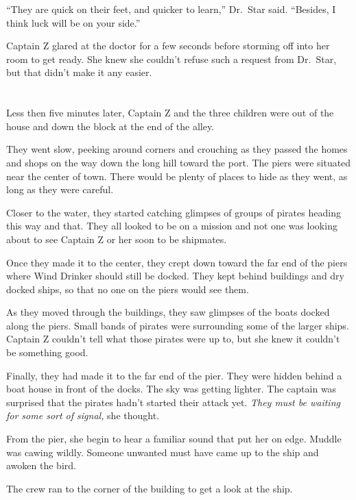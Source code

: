 \documentclass[12pt]{extbook}
\begin{document}
  \enquote{They are quick on their feet, and quicker to learn,} Dr.~Star
  said. \enquote{Besides, I think luck will be on your side.}
  
  Captain Z glared at the doctor for a few seconds before storming off
  into her room to get ready. She knew she couldn't refuse such a request
  from Dr.~Star, but that didn't make it any easier.
  
  \section{}\label{section-34}
  
  Less then five minutes later, Captain Z and the three children were out
  of the house and down the block at the end of the alley.
  
  They went slow, peeking around corners and crouching as they passed the
  homes and shops on the way down the long hill toward the port. The piers
  were situated near the center of town. There would be plenty of places
  to hide as they went, as long as they were careful.
  
  Closer to the water, they started catching glimpses of groups of pirates
  heading this way and that. They all looked to be on a mission and not
  one was looking about to see Captain Z or her soon to be shipmates.
  
  Once they made it to the center, they crept down toward the far end of
  the piers where Wind Drinker should still be docked. They kept behind
  buildings and dry docked ships, so that no one on the piers would see
  them.
  
  As they moved through the buildings, they saw glimpses of the boats
  docked along the piers. Small bands of pirates were surrounding some of
  the larger ships. Captain Z couldn't tell what those pirates were up to,
  but she knew it couldn't be something good.
  
  Finally, they had made it to the far end of the pier. They were hidden
  behind a boat house in front of the docks. The sky was getting lighter.
  The captain was surprised that the pirates hadn't started their attack
  yet. \emph{They must be waiting for some sort of signal,} she thought.
  
  From the pier, she begin to hear a familiar sound that put her on edge.
  Muddle was cawing wildly. Someone unwanted must have came up to the ship
  and awoken the bird.
  
  The crew ran to the corner of the building to get a look at the ship.
  
\end{document}
